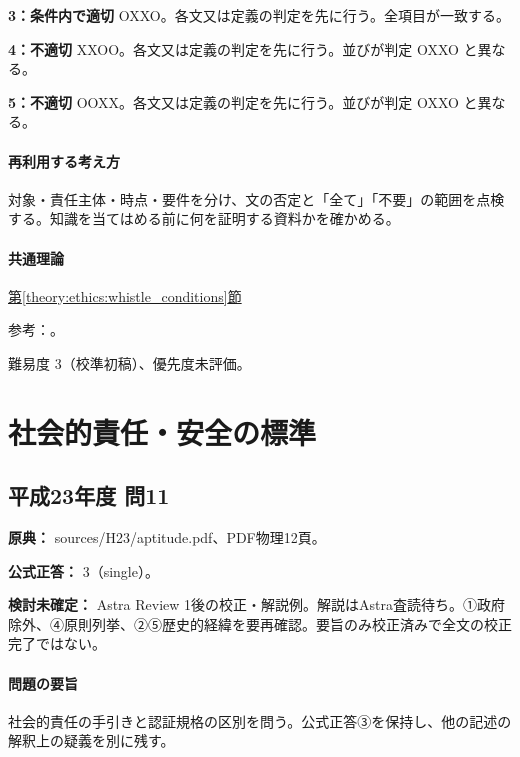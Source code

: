 \noindent\textbf{3：条件内で適切} OXXO。各文又は定義の判定を先に行う。全項目が一致する。\par

\noindent\textbf{4：不適切} XXOO。各文又は定義の判定を先に行う。並びが判定 OXXO と異なる。\par

\noindent\textbf{5：不適切} OOXX。各文又は定義の判定を先に行う。並びが判定 OXXO と異なる。\par

\paragraph{再利用する考え方} 対象・責任主体・時点・要件を分け、文の否定と「全て」「不要」の範囲を点検する。知識を当てはめる前に何を証明する資料かを確かめる。

\paragraph{共通理論} \hyperref[theory:ethics:whistle_conditions]{第\ref*{theory:ethics:whistle_conditions}節}

\par 参考：\cite{muroran_ethics_cases}。

\par 難易度 3（校準初稿）、優先度未評価。

\section{社会的責任・安全の標準}

\subsection{平成23年度 問11}
\label{q:h23-reg-apt-11}

\noindent\textbf{原典：} sources/H23/aptitude.pdf、PDF物理12頁。

\textbf{公式正答：} 3（single）。

\par\textbf{検討未確定：} Astra Review 1後の校正・解説例。解説はAstra査読待ち。①政府除外、④原則列挙、②⑤歴史的経緯を要再確認。要旨のみ校正済みで全文の校正完了ではない。

\paragraph{問題の要旨} 社会的責任の手引きと認証規格の区別を問う。公式正答③を保持し、他の記述の解釈上の疑義を別に残す。

